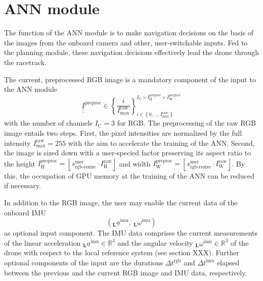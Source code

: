 \section{ANN module} \label{sec:ann_module}
The function of the ANN module is to 
make navigation decisions
on the basis of the images from the onboard camera and other, user-switchable inputs.
Fed to the planning module, 
these navigation decisions effectively
lead the drone through the racetrack.





The current, preprocessed RGB image 
is a mandatory component of the input to the ANN module
\begin{equation}
    \underline{\underline{\underline I}}^\text{preproc}
    \in 
    \left\{
        \frac{i}{I_\text{max}^\text{raw}}
    \right\}
    _{
        i \in 
        \left\{
            0,\dots,I_\text{max}^\text{raw}
        \right\}
    }
    ^{
        I_\text{C} \times    
        I_\text{H}^\text{preproc} \times 
        I_\text{W}^\text{preproc}
    }
\end{equation}
with the number of channels
$I_\text{C} = 3$
for RGB.
The preprocessing of the raw RGB image entails two steps.
First, 
the pixel intensities are normalized by the full intensity 
$I_\text{max}^\text{raw} = 255$
with the aim to accelerate the training of the ANN.
Second, the image is sized down with a user-specied 
factor preserving its aspect ratio
to the height 
$
    I_\text{H}^\text{preproc} 
    = 
    \left\lfloor
    s^\text{user}_\text{rgb-resize}
    \cdot
    I_\text{H}^\text{raw}
    \right\rfloor
$
and width
$
    I_\text{W}^\text{preproc} 
    = 
    \left\lfloor
    s^\text{user}_\text{rgb-resize}
    \cdot
    I_\text{W}^\text{raw}
    \right\rfloor
$.
By this,
the occupation of GPU memory at the training of the ANN
can be reduced if necessary.

In addition to the RGB image, 
the user may enable the current data of the onboard IMU 
\begin{equation}
    \left(
        {}_\textbf{L}\underline a^\text{imu}
        ,\ 
        {}_\textbf{L}\underline \omega^\text{imu}
    \right)
\end{equation}
as optional input component.
The IMU data comprises the current measurements of
the linear acceleration
$
    {}_\textbf{L}\underline a^\text{imu} \in \mathbb{R}^3
$
and the angular velocity
$   
    {}_\textbf{L}\underline \omega^\text{imu} \in \mathbb{R}^3
$
of the drone with respect to the local reference system (see section XXX).
Further optional components of the input are
the durations
$
    \Delta t^\text{rgb}
$
and
$
\Delta t^\text{imu}
$
elapsed between the previous and the current RGB image and IMU data, respectively.





